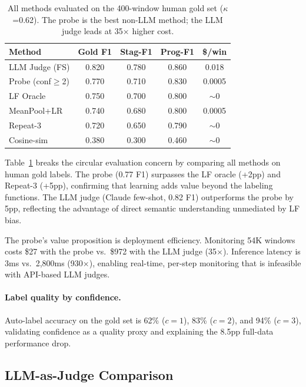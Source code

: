 \documentclass[11pt]{article}
\begin{document}
\begin{table}[t]
\centering
\small
\begin{tabular}{lcccc}
\toprule
\textbf{Method} & \textbf{Gold F1} & \textbf{Stag-F1} & \textbf{Prog-F1} & \textbf{\$/win} \\
\midrule
LLM Judge (FS) & 0.820 & 0.780 & 0.860 & 0.018 \\
Probe (conf$\geq$2) & 0.770 & 0.710 & 0.830 & 0.0005 \\
LF Oracle & 0.750 & 0.700 & 0.800 & $\sim$0 \\
MeanPool+LR & 0.740 & 0.680 & 0.800 & 0.0005 \\
Repeat-3 & 0.720 & 0.650 & 0.790 & $\sim$0 \\
Cosine-sim & 0.380 & 0.300 & 0.460 & $\sim$0 \\
\bottomrule
\end{tabular}
\caption{All methods evaluated on the 400-window human gold set ($\kappa$=0.62). The probe is the best non-LLM method; the LLM judge leads at 35$\times$ higher cost.}
\label{tab:gold}
\end{table}

Table~\ref{tab:gold} breaks the circular evaluation concern by comparing all methods on human gold labels. The probe (0.77 F1) surpasses the LF oracle (+2pp) and Repeat-3 (+5pp), confirming that learning adds value beyond the labeling functions. The LLM judge (Claude few-shot, 0.82 F1) outperforms the probe by 5pp, reflecting the advantage of direct semantic understanding unmediated by LF bias.

The probe's value proposition is deployment efficiency. Monitoring 54K windows costs \$27 with the probe vs.\ \$972 with the LLM judge (35$\times$). Inference latency is 3ms vs.\ 2,800ms (930$\times$), enabling real-time, per-step monitoring that is infeasible with API-based LLM judges.

\paragraph{Label quality by confidence.}
Auto-label accuracy on the gold set is 62\% ($c{=}1$), 83\% ($c{=}2$), and 94\% ($c{=}3$), validating confidence as a quality proxy and explaining the 8.5pp full-data performance drop.

\subsection{LLM-as-Judge Comparison}
\end{document}
